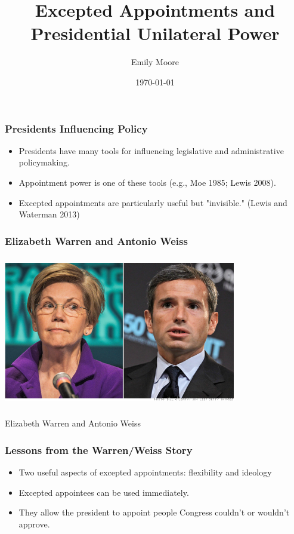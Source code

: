 \documentclass{beamer}
\title[Excepted Appointments and Presidential Unilateral Power]{Excepted Appointments and Presidential Unilateral Power}
\author{Emily Moore}
\institute[WUSTL]
{
Washington University-St. Louis \\
\medskip
{\emph{emily.moore@wustl.edu}}
}
\date{\today}
\begin{document}


%
\begin{frame}
\titlepage
\end{frame}
%
%

\begin{frame}
\frametitle{Presidents Influencing Policy}
\Large
\begin{itemize}\addtolength{\itemsep}{1\baselineskip}
\item Presidents have many tools for influencing legislative and administrative policymaking.
\item Appointment power is one of these tools (e.g., Moe 1985; Lewis 2008).
\item Excepted appointments are particularly useful but "invisible." (Lewis and Waterman 2013) 
\end{itemize}
\hfill%
\end{frame}


\begin{frame}
\frametitle{Elizabeth Warren and Antonio Weiss}
\begin{center}
\includegraphics[height=2.6in,width=4in]{WarrenWeiss.png}

Elizabeth Warren and Antonio Weiss
\end{center}
\end{frame}

\begin{frame}
\frametitle{Lessons from the Warren/Weiss Story}
\Large
\begin{itemize}\addtolength{\itemsep}{1.5\baselineskip}
\item Two useful aspects of excepted appointments: flexibility and ideology
\item Excepted appointees can be used immediately.
\item They allow the president to appoint people Congress couldn't or wouldn't approve.
\end{itemize}
\hfill%
\end{frame}
\end{document}
